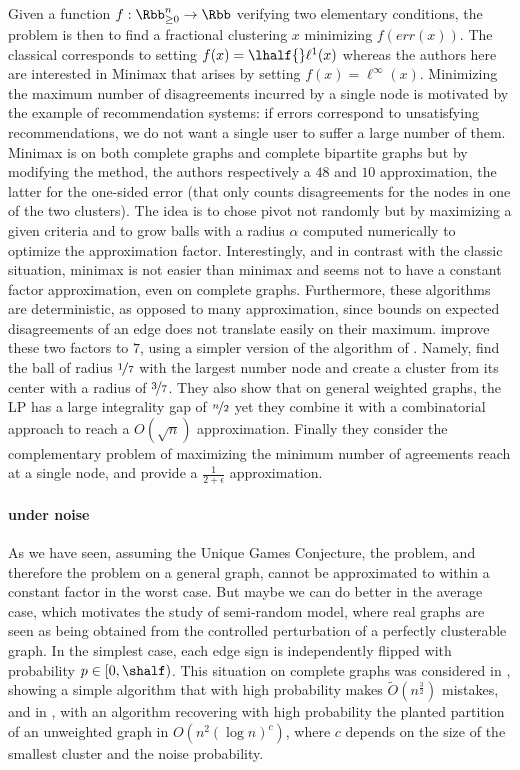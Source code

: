 Given a function $f: \Rbb^n_{\geq 0} \rightarrow \Rbb$ verifying two elementary conditions, the
problem is then to find a fractional clustering $x$ minimizing $f(err(x))$. The classical \pcc{}
corresponds to setting $f(x) = \lhalf{}\ell^1(x)$ whereas the authors here are interested in Minimax
\pcc{} that arises by setting $f(x) = \ell^\infty(x)$. Minimizing the maximum number of
disagreements incurred by a single node is motivated by the example of recommendation systems: if
errors correspond to unsatisfying recommendations, we do not want a single user to suffer a large
number of them. Minimax \pcc{} is \NPc{} on both complete graphs and complete bipartite graphs but
by modifying the \regionGrow{} method, the authors respectively a $48$ and
$10$ approximation, the latter for the one-sided error (that only counts disagreements for the nodes
in one of the two clusters).
The idea is to chose pivot not randomly but by maximizing a given criteria and
to grow balls with a radius $\alpha$ computed numerically to optimize the approximation factor.
Interestingly, and in contrast with the classic \pcc{} situation, minimax \maxa{} is not easier than
minimax \mind{} and seems not to have a constant factor approximation, even on complete graphs.
Furthermore, these algorithms are deterministic, as opposed to many \pcc{} approximation, since
bounds on expected disagreements of an edge does not translate easily on their maximum.
\Textcite{Charikar2017} improve these two factors to $7$, using a simpler version of the algorithm
of \textcite{pmlr-v48-puleo16}. Namely, find the ball of radius $\nicefrac{1}{7}$ with the largest
number node and create a cluster from its center with a radius of $\nicefrac{3}{7}$. They also show
that on general weighted graphs, the LP has a large integrality gap of $\nicefrac{n}{2}$ yet they
combine it with a combinatorial approach to reach a $O(\sqrt{n})$ approximation. Finally they
consider the complementary problem of maximizing the minimum number of agreements reach at a single
node, and provide a $\frac{1}{2+\epsilon}$ approximation.

\paragraph{\pcc{} under noise}

As we have seen, assuming the Unique Games Conjecture, the \mmc{} problem, and therefore
the \pcc{} problem on a general graph, cannot be approximated to within a constant factor in the worst
case.  But maybe we can do better in the average case, which motivates the study of semi-random
model, where real graphs are seen as being obtained from the controlled perturbation of a perfectly
clusterable graph. In the simplest case, each edge sign is independently flipped with probability
$p \in [0, \shalf)$. This situation on complete graphs was considered in \autocite[Section
6]{Bansal2002}, showing a simple algorithm that with high probability makes
$\tilde{O}(n^\frac{3}{2})$ mistakes, and in \autocite[Theorem 2.6]{Ben-Dor99}, with an algorithm
recovering with high probability the planted partition of an unweighted graph in $O(n^2(\log n)^c)$,
where $c$ depends on the size of the smallest cluster and the noise probability.

